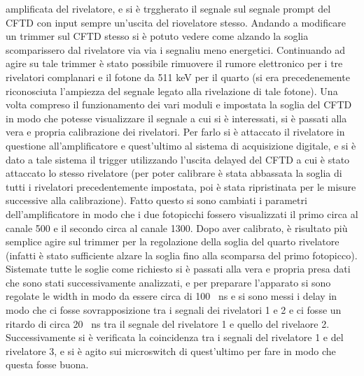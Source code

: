 amplificata del rivelatore, e si è trggherato il segnale sul segnale prompt del CFTD con input sempre un'uscita del riovelatore stesso. Andando a modificare un trimmer
sul CFTD stesso si è potuto vedere come alzando la soglia scomparissero dal rivelatore via via i segnaliu meno energetici. Continuando ad agire su tale trimmer è stato
possibile rimuovere il rumore elettronico per i tre rivelatori complanari e il fotone da 511 keV per il quarto (si era precedenemente riconosciuta l'ampiezza del segnale
legato alla rivelazione di tale fotone). Una volta compreso il funzionamento dei vari moduli e impostata la soglia del CFTD in modo che potesse visualizzare il segnale
a cui si è interessati, si è passati alla vera e propria calibrazione dei rivelatori. Per farlo si è attaccato il rivelatore in questione all'amplificatore e quest'ultimo
al sistema di acquisizione digitale, e si è dato a tale sistema il trigger utilizzando l'uscita delayed del CFTD a cui è stato attaccato lo stesso rivelatore (per poter
calibrare è stata abbassata la soglia di tutti i rivelatori precedentemente impostata, poi è stata ripristinata per le misure successive alla calibrazione). Fatto questo si
sono cambiati i parametri dell'amplificatore in modo che i due fotopicchi fossero visualizzati il primo circa al canale 500 e il secondo circa al canale 1300. Dopo aver
calibrato, è risultato più semplice agire sul trimmer per la regolazione della soglia del quarto rivelatore (infatti è stato sufficiente alzare la soglia fino alla scomparsa
del primo fotopicco).
Sistemate tutte le soglie come richiesto si è passati alla vera e propria presa dati che sono stati successivamente analizzati, e per preparare l'apparato si sono
regolate le width in modo da essere circa di 100 ~ns e si sono messi i delay in modo che ci fosse sovrapposizione tra i segnali dei rivelatori 1 e 2 e ci fosse un
ritardo di circa 20 ~ns tra il segnale del rivelatore 1 e quello del rivelaore 2. Successivamente si è verificata la coincidenza tra i segnali del rivelatore 1 e del
rivelatore 3, e si è agito sui microswitch di quest'ultimo per fare in modo che questa fosse buona.\\

